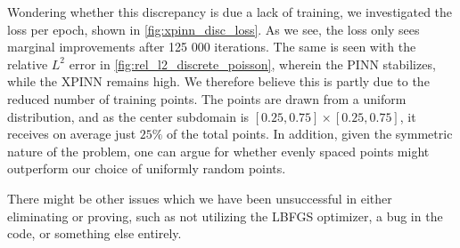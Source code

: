 Wondering whether this discrepancy is due a lack of training, we investigated the loss per epoch, shown in \autoref{fig:xpinn_disc_loss}.
As we see, the loss only sees marginal improvements after 125 000 iterations.
The same is seen with the relative $L^2$ error in \autoref{fig:rel_l2_discrete_poisson}, wherein the PINN stabilizes, while the XPINN remains high.
We therefore believe this is partly due to the reduced number of training points.
The points are drawn from a uniform distribution, and as the center subdomain is $[0.25, 0.75] \times [0.25, 0.75]$, it receives on average just $25\%$ of the total points.
In addition, given the symmetric nature of the problem, one can argue for whether evenly spaced points might outperform our choice of uniformly random points.

There might be other issues which we have been unsuccessful in either eliminating or proving, such as not utilizing the LBFGS optimizer, a bug in the code, or something else entirely.

